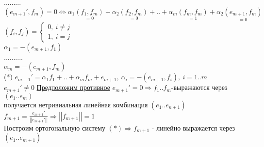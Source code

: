 .........\\
$(e_{m+1}',f_m)=0 \Leftrightarrow \alpha_1 \underset {=0} {(f_1,f_m)} + \alpha_2 \underset {=0} {(f_2,f_m)} + .. + \alpha_m \underset {=1} {(f_m,f_m)} + \alpha_2 \underset {=0} {(e_{m+1},f_m)}$ \\
$(f_i,f_j) = \left\{ \begin{matrix}
\mbox{$0, \ i \ne j $} \\
\mbox{$1, \ i=j$}
\end{matrix}\right.$ \\
$\alpha_1=-(e_{m+1},f_1)$ \\
.......... \\
$\alpha_m=-(e_{m+1},f_m)$ \\
(*) $e_{m+1}'=\alpha_1 f_1 + .. + \alpha_m f_m + e_{m+1}, \ \alpha_i=-(e_{m+1},f_i), \ i=1..m$ \\
$e_{m+1}' \ne 0 $ \underline{Предположим противное} $e_{m+1}'=0 \Rightarrow f_1..f_m$-выражаются через $(e_1..e_m)$ \\
получается нетривиальная линейная комбинация $(e_1..e_{n+1})$ \\
$f_{m+1}=\frac{e_{m+1}'}{\left| \left| e_{m+1}' \right| \right|} \Rightarrow \left| \left| f_{m+1} \right| \right| =1 $ \\
Построим ортогональную систему $ (*) \Rightarrow f_{m+1}$ - линейно выражается через $(e_1..e_{m+1})$ \\ 
